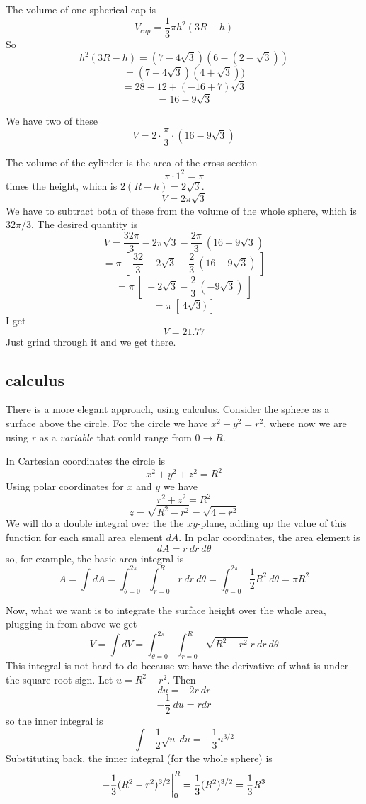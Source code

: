 \documentclass[11pt, oneside]{report}   	%
\begin{document}
The volume of one spherical cap is
\[ V_{cap} = \frac{1}{3} \pi h^2(3R - h) \]
So 
\[ h^2(3R - h) = (7- 4 \sqrt{3})(6-(2-\sqrt{3})) \]
\[ = (7- 4 \sqrt{3})(4 + \sqrt{3})) \]
\[ = 28 - 12 + (-16 + 7) \sqrt{3} \]
\[ = 16 - 9 \sqrt{3} \]

We have two of these
\[ V = 2 \cdot \frac{\pi}{3} \cdot (16 - 9 \sqrt{3}) \]

The volume of the cylinder is the area of the cross-section
\[ \pi \cdot 1^2 = \pi \]
 times the height, which is $2(R-h) = 2 \sqrt{3}$.
\[ V = 2 \pi \sqrt{3} \]
We have to subtract both of these from the volume of the whole sphere, which is $32 \pi/3$.  The desired quantity is
\[ V = \frac{32 \pi}{3} - 2 \pi \sqrt{3} - \frac{2\pi}{3} \ (16 - 9 \sqrt{3}) \]
\[ = \pi \ [ \ \frac{32}{3} - 2 \sqrt{3} - \frac{2}{3} \ (16 - 9 \sqrt{3}) \ ] \]
\[ = \pi \ [ \ - 2 \sqrt{3} - \frac{2}{3} \ ( - 9 \sqrt{3}) \ ] \]
\[ = \pi \ [ \ 4 \sqrt{3}) \ ] \]
I get
\[ V = 21.77  \]
Just grind through it and we get there.

\subsection*{calculus}

There is a more elegant approach, using calculus.  Consider the sphere as a surface above the circle.  For the circle we have $x^2 + y^2 = r^2$, where now we are using $r$ as a \emph{variable} that could range from $0 \rightarrow R$.

In Cartesian coordinates the circle is
\[ x^2 + y^2 + z^2 = R^2 \]
Using polar coordinates for $x$ and $y$ we have 
\[ r^2 + z^2 = R^2 \]
\[ z = \sqrt{R^2 - r^2} = \sqrt{4 - r^2}  \]
We will do a double integral over the the $xy$-plane, adding up the value of this function for each small area element $dA$.  In polar coordinates, the area element is
\[ dA = r \ dr \ d \theta \]
so, for example, the basic area integral is
\[ A = \int dA = \int_{\theta=0}^{2 \pi} \int_{r=0}^R r \ dr \ d \theta = \int_{\theta=0}^{2 \pi} \frac{1}{2}R^2 \ d \theta = \pi R^2 \]

Now, what we want is to integrate the surface height over the whole area, plugging in from above we get
\[ V = \int dV = \int_{\theta=0}^{2 \pi} \int_{r=0}^R \sqrt{R^2 - r^2}  \ r \ dr \ d \theta \]
This integral is not hard to do because we have the derivative of what is under the square root sign.  Let $u = R^2 - r^2$.  Then
\[ du = -2r \ dr \]
\[ -\frac{1}{2} \ du = r dr \]
so the inner integral is
\[ \int -\frac{1}{2} \sqrt{u} \  du = -\frac{1}{3} u^{3/2} \]
Substituting back, the inner integral (for the whole sphere) is 
\[ -\frac{1}{3} (R^2 -r^2)^{3/2} \bigg{|}_0^R = \frac{1}{3}(R^2)^{3/2} =  \frac{1}{3} R^3 \]
\end{document}

